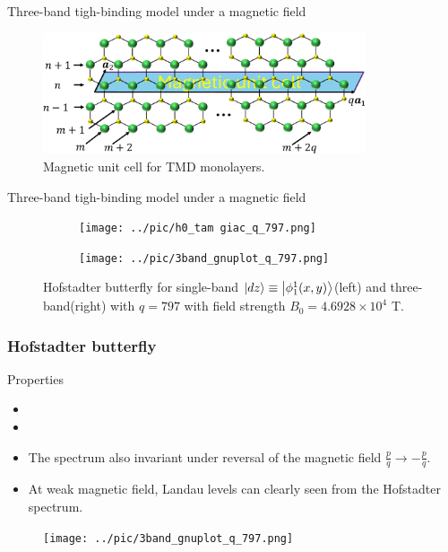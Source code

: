 \documentclass[aspectratio=169,compress,x11names]{beamer}
\begin{document}
	\begin{frame}{Three-band tigh-binding model under a magnetic field}
		\begin{figure}
			\centering
			\includegraphics[width=0.85\textwidth,height=0.35\linewidth]{pic/magneticUC_cut.pdf}
			\caption{\label{fig:Mag UC} Magnetic unit cell for TMD monolayers.}
		\end{figure}
	\end{frame}
	\begin{frame}{Three-band tigh-binding model under a magnetic field}
		\begin{figure}
			\centering
			\begin{subfigure}[b]{0.495\textwidth}
				\centering
				\texttt{[image: ../pic/h0\_tam giac\_q\_797.png]}
				\label{fig:3 band}
			\end{subfigure}
			\begin{subfigure}[b]{0.495\textwidth}
				\centering
				\texttt{[image: ../pic/3band\_gnuplot\_q\_797.png]}
				\label{fig:1 band}
			\end{subfigure}
			\caption{
				Hofstadter butterfly for single-band $\ket{dz} \equiv \ket{\phi_{1}^{1}(x,y)}$(left) and three-band(right) with $q = 797$ with field strength $B_{0} = 4.6928 \times 10^{4}$ T.
			}
		\end{figure}
	\end{frame}
 \begin{frame}
		\frametitle{Hofstadter butterfly}
		\begin{multicols}{2}
			\begin{minipage}{\columnwidth}
				\begin{block}{Properties}
					\begin{itemize}
						\item 
						\item 
						\item The spectrum also invariant under reversal of the magnetic field $\tfrac{p}{q} \to -\tfrac{p}{q}$.
						\item At weak magnetic field, Landau levels can clearly seen from the Hofstadter spectrum.
					\end{itemize}
				\end{block}
			\end{minipage}
			\begin{minipage}{\columnwidth}
				\begin{figure}
					\centering
					\texttt{[image: ../pic/3band\_gnuplot\_q\_797.png]}
				\end{figure}
				\smallskip
			\end{minipage}
		\end{multicols}
	\end{frame}
\end{document}
